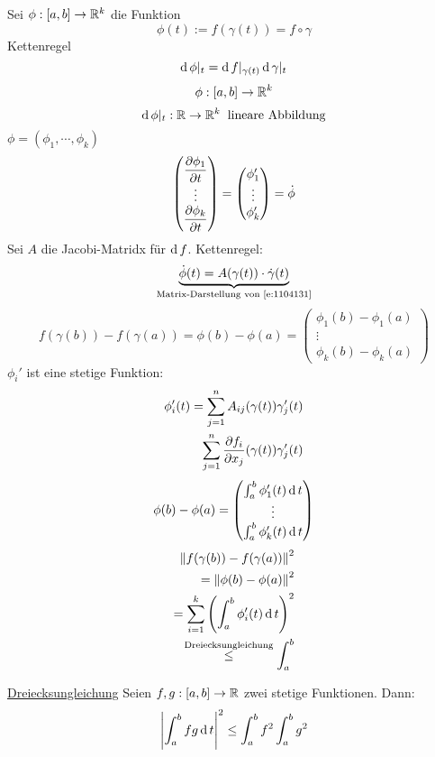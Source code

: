 \begin{Bew}
  Sei $\phi:[a,b]\rightarrow\mathbb{R}^k$ die Funktion
  \[\phi(t):=f(\gamma(t))=f\circ\gamma\]
  Kettenregel
  \begin{equation}
    \label{e:1104131}
    \operatorname{d} \phi|_t=\operatorname{d} f|_{\gamma(t)}\operatorname{d} \gamma|_t
  \end{equation}
  \[\phi:[a,b]\rightarrow\mathbb{R}^k\]
  \[\operatorname{d} \phi|_t:\mathbb{R}\rightarrow\mathbb{R}^k\hspace{2mm}\text{lineare Abbildung}\]
  $\phi=(\phi_1,\cdots,\phi_k)$
  \[ \begin{pmatrix}
    \dfrac{\partial \phi_1}{\partial t} \\ \vdots \\ \dfrac{\partial \phi_k}{\partial t} 
  \end{pmatrix} = \begin{pmatrix}
    \phi_1' \\ \vdots \\ \phi_k'
  \end{pmatrix} = \dot\phi \]
  Sei $A$ die Jacobi-Matridx für $\operatorname{d} f$. Kettenregel:
  \[\underbrace{\dot\phi(t)=A(\gamma(t))\cdot \dot\gamma(t)}_{\text{Matrix-Darstellung von \ref{e:1104131}}}\]
  \[f(\gamma(b))-f(\gamma(a))=\phi(b)-\phi(a)= \begin{pmatrix}
    \phi_1(b)-\phi_1(a) \\
    \vdots \\
    \phi_k(b)-\phi_k(a)
  \end{pmatrix}\]
  $\phi_i'$ ist eine stetige Funktion:
  \begin{eqnarray*}
    \phi_i'(t)=\sum_{j=1}^nA_{ij}(\gamma(t))\gamma_j'(t)\\
    \sum_{j=1}^n\dfrac{\partial f_i}{\partial x_j}(\gamma(t))\gamma_j'(t)
  \end{eqnarray*}
  \[\phi(b)-\phi(a)= \begin{pmatrix}
    \int_a^b\phi_1'(t)\operatorname{d} t\\
    \vdots \\
    \int_a^b\phi_k'(t)\operatorname{d} t
  \end{pmatrix} \]
  \begin{eqnarray*}
    \left\| f(\gamma(b))-f(\gamma(a)) \right\|^2 \\
    = \left\| \phi(b)-\phi(a) \right\|^2\\
    = \sum^k_{i=1}\left( \int_a^b\phi_i'(t)\operatorname{d} t \right)^2\\
    \stackrel{\text{Dreiecksungleichung}}{\leq} \int_a^b
  \end{eqnarray*}
  \begin{Lem}\ul{Dreiecksungleichung} Seien $f,g:[a,b]\rightarrow\mathbb{R}$ zwei stetige Funktionen. Dann:
    \[\left| \int_a^bfg\operatorname{d} t \right|^2\leq\int_a^bf^2\int_a^bg^2\]

\end{Lem}
\end{Bew}
